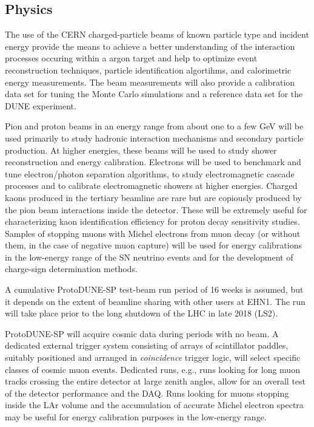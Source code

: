 {%
\subsection{Physics}

The use of the CERN charged-particle beams of known particle type and incident energy provide the means to achieve a better understanding of the interaction processes occuring within a argon target and help to optimize event reconstruction techniques, particle identification algortihms, and calorimetric energy measurements.   
The beam measurements will also provide a calibration data set for tuning the Monte Carlo simulations and a reference data set for the DUNE experiment. 

Pion and proton beams in an energy range from about one to a few GeV will be used primarily to study hadronic interaction mechanisms and secondary particle production.  At higher energies, these beams will be used to study shower reconstruction and energy calibration. Electrons will be used to benchmark and tune electron/photon separation algorithms, to study electromagnetic cascade processes and to calibrate electromagnetic showers at higher energies. Charged kaons produced in the tertiary beamline are rare but are copiously produced by the pion beam interactions inside the detector. These will be extremely useful for characterizing kaon identification efficiency for proton decay sensitivity studies.  Samples of stopping muons with Michel electrons from muon decay (or without them, in the case of negative muon capture) will be used for energy calibrations in the low-energy range of the SN neutrino events and for the development of charge-sign determination methods. 

A cumulative ProtoDUNE-SP test-beam run period of 16 weeks is assumed, but it depends on the extent of beamline sharing with other users at EHN1. The run will take place prior to the long shutdown of the LHC in late 2018 (LS2). 

ProtoDUNE-SP will acquire cosmic data during periods with no beam. A dedicated external trigger system consisting of arrays of scintillator paddles, suitably positioned and arranged in \textit{coincidence} trigger logic, 
will select specific classes of cosmic muon events. Dedicated runs, e.g., runs looking for long muon tracks crossing the entire detector at large zenith angles, allow for an overall test of the detector performance and the DAQ. Runs looking for muons stopping inside the LAr volume and the accumulation of accurate Michel electron spectra may be useful for energy calibration purposes in the low-energy range.

}
